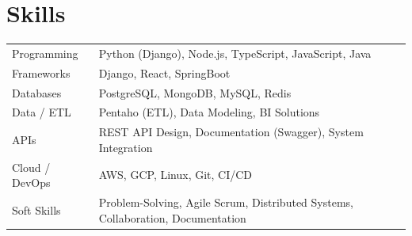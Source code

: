 \documentclass[a4paper,12pt]{article}
\begin{document}
    \section{Skills}
    \begin{tabularx}{\linewidth}{@{}l X@{}}
        Programming & Python (Django), Node.js, TypeScript, JavaScript, Java \\
        Frameworks & Django, React, SpringBoot \\
        Databases & PostgreSQL, MongoDB, MySQL, Redis \\
        Data / ETL & Pentaho (ETL), Data Modeling, BI Solutions \\
        APIs & REST API Design, Documentation (Swagger), System Integration \\
        Cloud / DevOps & AWS, GCP, Linux, Git, CI/CD \\
        Soft Skills & Problem-Solving, Agile Scrum, Distributed Systems, Collaboration, Documentation \\
    \end{tabularx}


    \vfill
\end{document}
